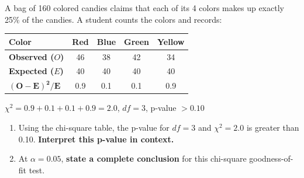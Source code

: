 \documentclass[10pt]{article}
\begin{document}
\namedateperiod

\vspace{0.1in}

A bag of 160 colored candies claims that each of its 4 colors makes up exactly 25\% of
the candies. A student counts the colors and records:

\renewcommand{\arraystretch}{1.4}
\begin{center}
\begin{tabular}{lcccc}
    \textbf{Color}            & Red & Blue & Green & Yellow \\
    \hline
    \textbf{Observed ($O$)}   & 46  & 38   & 42    & 34     \\
    \textbf{Expected ($E$)}   & 40  & 40   & 40    & 40     \\
    $\boldsymbol{(O-E)^2/E}$  & 0.9 & 0.1  & 0.1   & 0.9    \\
\end{tabular}
\end{center}

\vspace{0.05in}
$\chi^2 = 0.9 + 0.1 + 0.1 + 0.9 = 2.0$, \quad $df = 3$, \quad p-value $> 0.10$

\vspace{0.12in}

\begin{enumerate}

  \item Using the chi-square table, the p-value for $df = 3$ and $\chi^2 = 2.0$ is
        greater than 0.10. \textbf{Interpret this p-value in context.}


  \item At $\alpha = 0.05$, \textbf{state a complete conclusion} for this chi-square
        goodness-of-fit test.


\end{enumerate}
\end{document}
